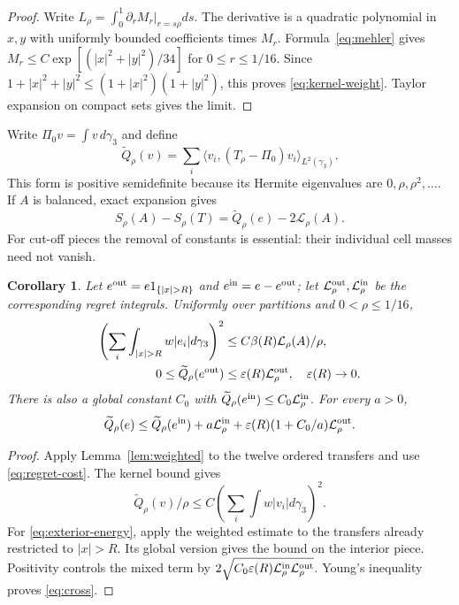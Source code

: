\documentclass[11pt,reqno]{amsart}
\newtheorem{corollary}[theorem]{Corollary}
\theoremstyle{remark}
\newcommand{\ip}[2]{\langle #1,#2\rangle}
\newcommand{\ga}{\gamma}
\newcommand{\LL}{\mathcal L}
\begin{document}
\begin{proof}
Write $L_\rho=\int_0^1\partial_rM_r|_{r=s\rho}ds$.
The derivative is a quadratic polynomial in $x,y$ with uniformly bounded
coefficients times $M_r$. Formula~\eqref{eq:mehler} gives
$M_r\le C\exp[(|x|^2+|y|^2)/34]$ for $0\le r\le1/16$.
Since $1+|x|^2+|y|^2\le(1+|x|^2)(1+|y|^2)$, this proves
\eqref{eq:kernel-weight}. Taylor expansion on compact sets gives the limit.
\end{proof}

Write $\Pi_0v=\int v\,d\ga_3$ and define
\[
 \widetilde Q_\rho(v)=\sum_i\ip{v_i}{(T_\rho-\Pi_0)v_i}_{L^2(\ga_3)}.
\]
This form is positive semidefinite because its Hermite eigenvalues are
$0,\rho,\rho^2,\ldots$. If $A$ is balanced, exact expansion gives
\begin{equation}\label{eq:comparison}
 S_\rho(A)-S_\rho(T)=\widetilde Q_\rho(e)-2\LL_\rho(A).
\end{equation}
For cut-off pieces the removal of constants is essential: their individual
cell masses need not vanish.

\begin{corollary}\label{cor:exterior}
Let $e^{\rm out}=e1_{\{|x|>R\}}$ and $e^{\rm in}=e-e^{\rm out}$;
let $\LL_\rho^{\rm out},\LL_\rho^{\rm in}$ be the corresponding
regret integrals. Uniformly over partitions and $0<\rho\le1/16$,
\begin{align}
 \left(\sum_i\int_{|x|>R}w|e_i|d\ga_3\right)^2
 &\le C\beta(R)\LL_\rho(A)/\rho,\label{eq:tv-tail}\\
 0\le\widetilde Q_\rho(e^{\rm out})
 &\le\varepsilon(R)\LL_\rho^{\rm out},
 \quad\varepsilon(R)\to0.\label{eq:exterior-energy}
\end{align}
There is also a global constant $C_0$ with
$\widetilde Q_\rho(e^{\rm in})\le C_0\LL_\rho^{\rm in}$.
For every $a>0$,
\begin{equation}\label{eq:cross}
 \widetilde Q_\rho(e)\le\widetilde Q_\rho(e^{\rm in})
 +a\LL_\rho^{\rm in}
 +\varepsilon(R)(1+C_0/a)\LL_\rho^{\rm out}.
\end{equation}
\end{corollary}

\begin{proof}
Apply Lemma~\ref{lem:weighted} to the twelve ordered transfers and use
\eqref{eq:regret-cost}. The kernel bound gives
\[
 \widetilde Q_\rho(v)/\rho
 \le C\left(\sum_i\int w|v_i|d\ga_3\right)^2.
\]
For \eqref{eq:exterior-energy}, apply the weighted estimate to the
transfers already restricted to $|x|>R$. Its global version gives the
bound on the interior piece. Positivity controls the mixed term by
$2\sqrt{C_0\varepsilon(R)\LL_\rho^{\rm in}\LL_\rho^{\rm out}}$.
Young's inequality proves \eqref{eq:cross}.
\end{proof}
\end{document}
